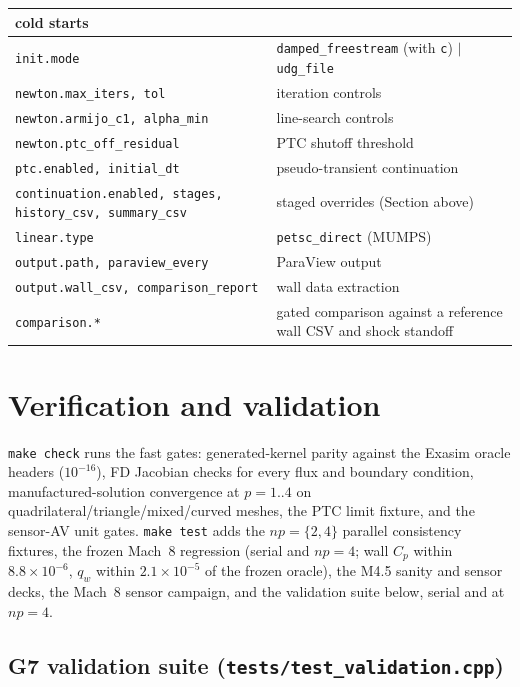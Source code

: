 \documentclass[11pt]{article}
\newcommand{\code}[1]{\texttt{#1}}
\begin{document}
\begin{center}
\begin{longtable}{p{}p{}}
   cold starts \\
\midrule
\code{init.mode} & \code{damped\_freestream} (with \code{c}) $|$
   \code{udg\_file} \\
\midrule
\code{newton.max\_iters, tol} & iteration controls \\
\code{newton.armijo\_c1, alpha\_min} & line-search controls \\
\code{newton.ptc\_off\_residual} & PTC shutoff threshold \\
\code{ptc.enabled, initial\_dt} & pseudo-transient continuation \\
\midrule
\code{continuation.enabled, stages, history\_csv, summary\_csv} &
   staged overrides (Section above) \\
\midrule
\code{linear.type} & \code{petsc\_direct} (MUMPS) \\
\midrule
\code{output.path, paraview\_every} & ParaView output \\
\code{output.wall\_csv, comparison\_report} & wall data extraction \\
\code{comparison.*} & gated comparison against a reference wall CSV
   and shock standoff \\
\bottomrule
\end{longtable}
\end{center}

\section{Verification and validation}
\label{sec:validation}

\code{make check} runs the fast gates: generated-kernel parity against
the Exasim oracle headers ($10^{-16}$), FD Jacobian checks for every
flux and boundary condition, manufactured-solution convergence at
$p = 1..4$ on quadrilateral/triangle/mixed/curved meshes, the PTC
limit fixture, and the sensor-AV unit gates. \code{make test} adds the
$np = \{2,4\}$ parallel consistency fixtures, the frozen Mach~8
regression (serial and $np=4$; wall $C_p$ within $8.8\times10^{-6}$,
$q_w$ within $2.1\times10^{-5}$ of the frozen oracle), the M4.5
sanity and sensor decks, the Mach~8 sensor campaign, and the validation
suite below, serial and at $np=4$.

\subsection*{G7 validation suite (\code{tests/test\_validation.cpp})}
\end{document}
